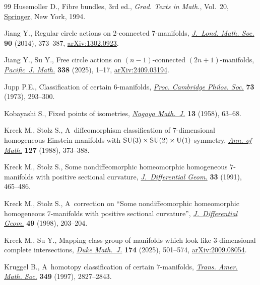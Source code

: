 \begin{thebibliography}{99}
Husemoller D., Fibre bundles, 3rd ed., \textit{Grad. Texts in Math.}, Vol.~20,
  \href{https://doi.org/10.1007/978-1-4757-2261-1}{Springer}, New York, 1994.

Jiang Y., Regular circle actions on 2-connected 7-manifolds,
  \href{https://doi.org/10.1112/jlms/jdu028}{\textit{J.~Lond. Math. Soc.}}
  \textbf{90} (2014), 373--387,
  \href{https://arxiv.org/abs/1302.0923}{arXiv:1302.0923}.

Jiang Y., Su Y., Free circle actions on {$(n-1)$}-connected
  {$(2n+1)$}-manifolds,
  \href{https://doi.org/10.2140/pjm.2025.338.1}{\textit{Pacific~J. Math.}}
  \textbf{338} (2025), 1--17,
  \href{https://arxiv.org/abs/2409.03194}{arXiv:2409.03194}.

Jupp P.E., Classification of certain {$6$}-manifolds,
  \href{https://doi.org/10.1017/s0305004100076854}{\textit{Proc. Cambridge
  Philos. Soc.}} \textbf{73} (1973), 293--300.

Kobayashi S., Fixed points of isometries,
  \href{https://doi.org/10.1017/S0027763000023497}{\textit{Nagoya Math.~J.}}
  \textbf{13} (1958), 63--68.

Kreck M., Stolz S., A~diffeomorphism classification of {$7$}-dimensional
  homogeneous {E}instein manifolds with {${\rm SU}(3)\times{\rm
  SU}(2)\times{\rm U}(1)$}-symmetry,
  \href{https://doi.org/10.2307/2007059}{\textit{Ann. of Math.}} \textbf{127}
  (1988), 373--388.

Kreck M., Stolz S., Some nondiffeomorphic homeomorphic homogeneous
  {$7$}-manifolds with positive sectional curvature,
  \href{https://doi.org/10.4310/jdg/1214446327}{\textit{J.~Differential Geom.}}
  \textbf{33} (1991), 465--486.

Kreck M., Stolz S., A~correction on ``{S}ome nondiffeomorphic homeomorphic
  homogeneous {$7$}-manifolds with positive sectional curvature'',
  \href{https://doi.org/10.4310/jdg/1214460941}{\textit{J.~Differential Geom.}}
  \textbf{49} (1998), 203--204.

Kreck M., Su Y., Mapping class group of manifolds which look like 3-dimensional
  complete intersections,
  \href{https://doi.org/10.1215/00127094-2024-0036}{\textit{Duke Math.~J.}}
  \textbf{174} (2025), 501--574,
  \href{https://arxiv.org/abs/2009.08054}{arXiv:2009.08054}.

Kruggel B., A~homotopy classification of certain {$7$}-manifolds,
  \href{https://doi.org/10.1090/S0002-9947-97-01962-4}{\textit{Trans. Amer.
  Math. Soc.}} \textbf{349} (1997), 2827--2843.


\end{thebibliography}
